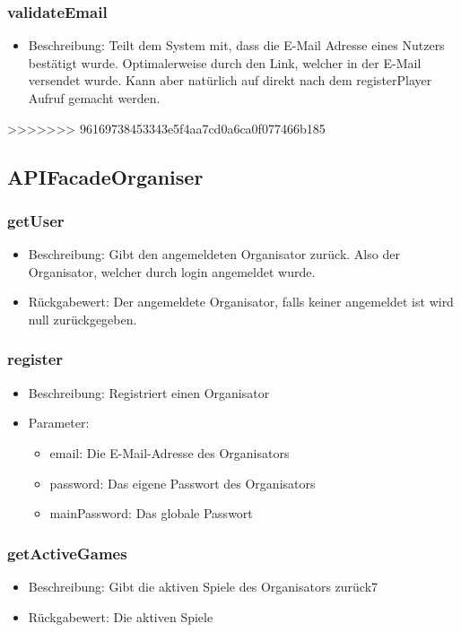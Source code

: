 \documentclass[a4paper]{scrreprt}
\begin{document}
	\subsubsection{validateEmail}
	\begin{itemize}
		\item Beschreibung: Teilt dem System mit, dass die E-Mail Adresse eines Nutzers bestätigt wurde. Optimalerweise durch den Link, welcher in der E-Mail versendet wurde. Kann aber natürlich auf direkt nach dem registerPlayer Aufruf gemacht werden.
	\end{itemize}
>>>>>>> 96169738453343e5f4aa7cd0a6ca0f077466b185
	\subsection{APIFacadeOrganiser}
	\subsubsection{getUser}
		\begin{itemize}
			\item Beschreibung: Gibt den angemeldeten Organisator zurück. Also der Organisator, welcher durch login angemeldet wurde.
			\item Rückgabewert: Der angemeldete Organisator, falls keiner angemeldet ist wird null zurückgegeben.
		\end{itemize}
	\subsubsection{register}
	\begin{itemize}
		\item Beschreibung: Registriert einen Organisator
		\item Parameter:
		\begin{itemize}
		\item email: Die E-Mail-Adresse des Organisators
		\item password: Das eigene Passwort des Organisators
		\item mainPassword: Das globale Passwort
		\end{itemize}
		\end{itemize}
	\subsubsection{getActiveGames}
	\begin{itemize}
	\item Beschreibung: Gibt die aktiven Spiele des Organisators zurück7
	\item Rückgabewert: Die aktiven Spiele
	\end{itemize}
\end{document}
